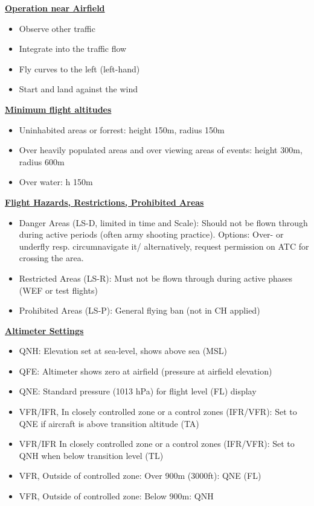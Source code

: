 \documentclass[9pt, landscape, fleqn]{scrartcl}
\begin{document}
\begin{multicols*}{3}
\underline{\textbf{Operation near Airfield}}
\begin{itemize}
    \item Observe other traffic 
    \item Integrate into the traffic flow 
    \item Fly curves to the left (left-hand)
    \item Start and land against the wind 
\end{itemize}
\underline{\textbf{Minimum flight altitudes}}
\begin{itemize}
    \item Uninhabited areas or forrest: height 150m, radius 150m 
    \item Over heavily populated areas and over viewing areas of events: height 300m, radius 600m
    \item Over water: h 150m
\end{itemize}
\underline{\textbf{Flight Hazards, Restrictions, Prohibited Areas}}
\begin{itemize}
    \item Danger Areas (LS-D, limited in time and Scale): Should not be flown through during active periods (often army shooting practice). Options: Over- or underfly resp. circumnavigate it/ alternatively, request permission on ATC for crossing the area.
    \item Restricted Areas (LS-R): Must not be flown through during active phases (WEF or test flights)
    \item Prohibited Areas (LS-P): General flying ban (not in CH applied)
\end{itemize}
\underline{\textbf{Altimeter Settings}}
\begin{itemize}
    \item QNH: Elevation set at sea-level, shows above sea (MSL)
    \item QFE: Altimeter shows zero at airfield (pressure at airfield elevation)
    \item QNE: Standard pressure (1013 hPa) for flight level (FL) display
    \item VFR/IFR, In closely controlled zone or a control zones (IFR/VFR): Set to QNE if aircraft is above transition altitude (TA)
    \item VFR/IFR In closely controlled zone or a control zones (IFR/VFR): Set to QNH when below transition level (TL)
    \item VFR, Outside of controlled zone: Over 900m (3000ft): QNE (FL) 
    \item VFR, Outside of controlled zone: Below 900m: QNH 

\end{itemize}
\end{multicols*}
\end{document}
